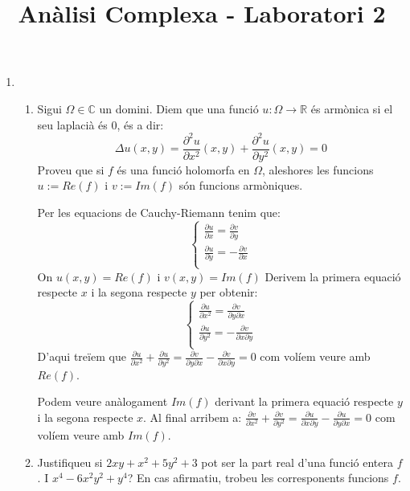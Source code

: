 \documentclass[10pt,a4paper]{article}
\author{ }
\title{Anàlisi Complexa - Laboratori 2}
\begin{document}
\maketitle

\begin{enumerate}
\item
	\begin{enumerate}
	\item Sigui $\Omega\in\mathbb{C}$ un domini. Diem que una funció $u:\Omega\rightarrow\mathbb{R}$ és armònica si el seu laplacià és 0, és a dir:
	$$\Delta u(x,y)=\frac{\partial^{2}u}{\partial x^{2}}(x,y) + \frac{\partial^{2}u}{\partial y^{2}}(x,y)=0$$
	Proveu que si $f$ és una funció holomorfa en $\Omega$, aleshores les funcions $u:=Re(f)$ i $v:=Im(f)$ són funcions armòniques.
	\begin{framed}
	
	Per les equacions de Cauchy-Riemann tenim que:
	$$
	\begin{cases}
		\frac{\partial u}{\partial x} = \frac{\partial v}{\partial y} \\
		\frac{\partial u}{\partial y} = -\frac{\partial v}{\partial x} \\
	\end{cases}
	$$
	On $u(x,y)=Re(f)$ i $v(x,y)=Im(f)$
	Derivem la primera equació respecte $x$ i la segona respecte $y$ per obtenir:
	$$
	\begin{cases}
		\frac{\partial u}{\partial x^{2}} = \frac{\partial v}{\partial y \partial x} \\
		\frac{\partial u}{\partial y^{2}} = -\frac{\partial v}{\partial x \partial y} \\
	\end{cases}
	$$	
	D'aqui treïem que $\frac{\partial u}{\partial x^{2}} + \frac{\partial u}{\partial y^{2}} = \frac{\partial v}{\partial y \partial x} - \frac{\partial v}{\partial x \partial y} = 0$ com volíem veure amb $Re(f)$.
	
	Podem veure anàlogament $Im(f)$ derivant la primera equació respecte $y$ i la segona respecte $x$. Al final arribem a: $\frac{\partial v}{\partial x^{2}} + \frac{\partial v}{\partial y^{2}} = \frac{\partial u}{\partial x \partial y} - \frac{\partial u}{\partial y \partial x} = 0$ com volíem veure amb $Im(f)$.
	\end{framed}
	\item Justifiqueu si $2xy+x^{2}+5y^{2}+3$ pot ser la part real d'una funció entera $f$. I $x^{4}-6x^{2}y^{2}+y^{4}$? En cas afirmatiu, trobeu les corresponents funcions $f$.


\end{enumerate}
\end{enumerate}
\end{document}
